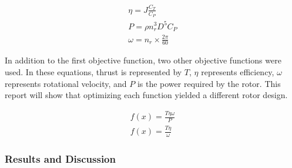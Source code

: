 \documentclass{article}
\begin{document}
\begin{equation}
\begin{aligned}
	\eta = J \frac{C_{T}}{C_{P}} \\
	P = \rho n_{r}^{3} D^{5} C_{P} \\
	\omega = n_{r} \times \frac{2 \pi}{60}
\end{aligned}
\end{equation}

In addition to the first objective function, two other objective functions were used. In these equations, thrust is represented by $T$, $\eta$ represents efficiency, $\omega$ represents rotational velocity, and $P$ is the power required by the rotor. This report will show that optimizing each function yielded a different rotor design. 

\begin{equation}
\begin{aligned}
	f(x) = \frac{T \eta \omega}{P}  \\
	f(x) = \frac{T \eta}{\omega}
\end{aligned}
\end{equation}

\subsubsection*{Results and Discussion}
\end{document}

